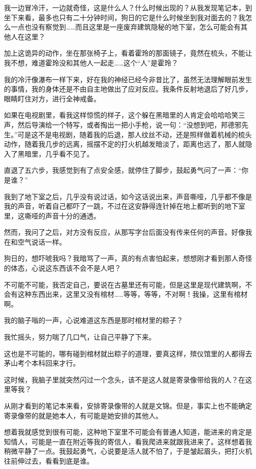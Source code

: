 我一边冒冷汗，一边就奇怪，这是什么人？什么时候出现的？从我发现笔记本，到坐下来看，最多也只有二十分钟时间，狗日的它是什么时候坐到我对面去的？我怎么一点也没有察觉到……而且这里是一座废弃建筑隐秘的地下室，怎么可能会有其他人在这里？

加上这诡异的动作，坐在那张椅子上，看着霍玲的那面镜子，竟然在梳头，不能让我不想，难道霍玲没和其他人一起走……这个“人”是霍玲？

我的冷汗像瀑布一样下来，好在我的神经已经今非昔比了，虽然无法理解眼前发生的事情，我的身体还是不由自主地做出了应对反应。我条件反射地退后了好几步，眼睛盯住对方，进行全神戒备。

如果在电视剧里，看我这样惊慌的样子，这个躲在黑暗里的人肯定会哈哈哈笑三声，然后导演给一个特写，或者掏出一把小手枪，说一句：“没想到吧，邦德邪先生。”可是这不是电视剧，随着我的后退，那人纹丝不动，还是照样做着机械的梳头动作，随着我几步的远离，摇摆不定的打火机越发暗淡了，距离也远了，那人就隐入了黑暗里，几乎看不见了。

直退了五六步，我感觉到有了点安全感，就停住了脚步，鼓起勇气问了一声：“你是谁？”

我到了地下室之后，几乎没有说过话，如今这话说出来，声音嘶哑，几乎都不像是我的声音，听着自己都吓了一跳，不过在这安静得连针掉在地上都听到的地下室里，这嘶哑的声音十分的通透。

然而，我问了之后，对方没有反应，从那写字台后面没有传来任何的声音。好像我在和空气说话一样。

狗日的，想吓唬我吗？我暗骂了一声，真的有点害怕起来，想想刚才看到那人奇怪的体态，心说这东西该不会不是人吧？

不可能不可能，我否定自己，要说在古墓里还有可能，但是这里是现代建筑啊，不会有这种东西出来，这里又没有棺材……等等，等等，不对啊！我操，这里有棺材啊。

我的脑子嗡的一声，心说难道这东西是那时棺材里的粽子？

我忙摇头，努力喘了几口气，让自己平静了下来。

这也是不可能的，哪有碰到棺材就出粽子的道理，要真这样，殡仪馆里的人都得去茅山考个本科回来才行。

这时候，我脑子里就突然闪过一个念头，该不是这人就是寄录像带给我的人？在这里等我？

从刚才看到的笔记本来看，安排寄录像带的人就是文锦。但是，事实上也不能确定寄录像带的就是她本人，有可能是她安排的其他人。

想着我就感觉到很有可能，这种地下室里不可能会有普通人知道，能进来的肯定是知情人，可能是一直在附近等我的寄信人，看我爬进来就跟我进来了。这样想着我稍微平静了一点。我鼓起勇气，心说要是活人就不怕了，于是皱起眉头，把打火机往前伸过去，看看到底是谁。

